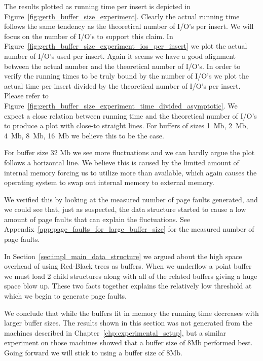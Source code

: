 \documentclass[twoside,11pt,openright]{report}
\begin{document}
The results plotted as running time per insert is depicted in Figure~\ref{fig:gerth_buffer_size_experiment}. Clearly the actual running time follows the same tendency as the theoretical number of I/O's per insert. We will focus on the number of I/O's to support this claim. In Figure~\ref{fig:gerth_buffer_size_experiment_ios_per_insert} we plot the actual number of I/O's used per insert. Again it seems we have a good alignment between the actual number and the theoretical number of I/O's. In order to verify the running times to be truly bound by the number of I/O's we plot the actual time per insert divided by the theoretical number of I/O's per insert. Please refer to Figure~\ref{fig:gerth_buffer_size_experiment_time_divided_asymptotic}. We expect a close relation between running time and the theoretical number of I/O's to produce a plot with close-to straight lines. For buffers of sizes 1~Mb, 2~Mb, 4~Mb, 8~Mb, 16~Mb we believe this to be the case. 

For buffer size 32 Mb we see more fluctuations and we can hardly argue the plot follows a horizontal line. We believe this is caused by the limited amount of internal memory forcing us to utilize more than available, which again causes the operating system to swap out internal memory to external memory. 

We verified this by looking at the measured number of page faults generated, and we could see that, just as suspected, the data structure started to cause a low amount of page faults that can explain the fluctuations. See Appendix~\ref{app:page_faults_for_large_buffer_size} for the measured number of page faults.

In Section~\ref{sec:impl_main_data_structure} we argued about the high space overhead of using Red-Black trees as buffers. When we underflow a point buffer we must load 2 child structures along with all of the related buffers giving a huge space blow up. These two facts together explains the relatively low threshold at which we begin to generate page faults.

We conclude that while the buffers fit in memory the running time decreases with larger buffer sizes. The results shown in this section was not generated from the machines described in Chapter~\ref{chp:experimental_setup}, but a similar experiment on those machines showed that a buffer size of 8Mb performed best. Going forward we will stick to using a buffer size of 8Mb.
\end{document}
